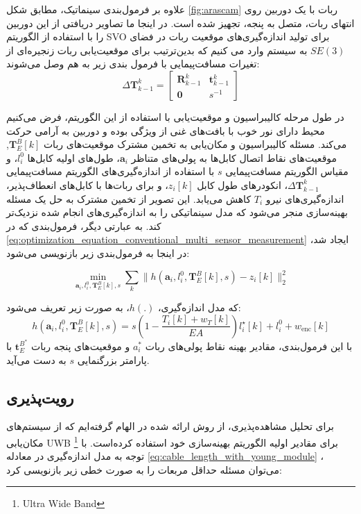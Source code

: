 علاوه بر فرمول‌بندی سینماتیک، مطابق شکل
\ref{fig:arascam}
 ربات با یک دوربین روی انتهای ربات، متصل به پنجه، تجهیز شده است. در اینجا ما تصاویر دریافتی از این دوربین را با استفاده از الگوریتم SVO
\cite{Forster2014ICRA}
  برای تولید اندازه‌گیری‌های موقعیت ربات در فضای
$SE(3)$
به سیستم وارد می کنیم که بدین‌ترتیب برای موقعیت‌یابی ربات زنجیره‌ای از تغیرات مسافت‌پیمایی با فرمول بندی زیر به هم وصل می‌شوند:
\begin{equation}
	\Delta \boldsymbol{T}^k_{k-1} = \begin{bmatrix} \boldsymbol{R}^k_{k-1} & \boldsymbol{t}^k_{k-1} \\ \boldsymbol{0} & s^{-1} \end{bmatrix}
\end{equation}

در طول مرحله کالیبراسیون و موقعیت‌یابی با استفاده از این الگوریتم، فرض می‌کنیم محیط‌ دارای نور خوب با بافت‌های غنی از ویژگی بوده و دوربین به آرامی حرکت می‌کند.  مسئله کالیبراسیون و مکان‌یابی به تخمین مشترک موقعیت‌های ربات
$\boldsymbol{T}^B_E [k]$,
موقعیت‌های نقاط اتصال کابل‌ها به پولی‌های متناظر
$\boldsymbol{a}_i$،
 طول‌های اولیه کابل‌ها
$l_{i}^0$،
و مقیاس الگوریتم مسافت‌پیمایی
$s$
با استفاده از اندازه‌گیری‌های الگوریتم مسافت‌پیمایی
 \( \Delta \boldsymbol{T}^k_{k-1} \)،
انکودرهای طول کابل
$z_i [k]$،
و برای ربات‌ها با کابل‌های انعطاف‌پذیر، اندازه‌گیری‌های نیرو 
$T_i$ 
کاهش می‌یابد. این تصویر از تخمین مشترک به حل یک مسئله بهینه‌سازی منجر می‌شود که مدل سینماتیکی را به اندازه‌گیری‌های انجام شده نزدیک‌تر کند. به عبارتی دیگر، فرمول‌بندی که در
 \ref{eq:optimization_equation_conventional_multi_sensor_measurement} 
 ایجاد شد، در اینجا به فرمول‌بندی زیر بازنویسی می‌شود:

\begin{equation}
	\min_{\boldsymbol{a}_i, l_{i}^0, \boldsymbol{T}^B_E [k], s} \sum_k \| h(\boldsymbol{a}_i, l_{i}^0, \boldsymbol{T}^B_E [k], s) - z_i [k] \|^2_2
\end{equation}

که مدل اندازه‌گیری، \( h(.) \)، به صورت زیر تعریف می‌شود:
\begin{equation}
	h(\boldsymbol{a}_i, l_{i}^0, \boldsymbol{T}^B_E [k], s) = s \left( 1 - \frac{T_i [k] + w_T [k]}{EA} \right) l^\star_i [k] + l_{i}^0 + w_{\text{enc}} [k] 
\end{equation}
با این فرمول‌بندی، مقادیر بهینه نقاط پولی‌های ربات
$a_i^*$
و موقعیت‌های پنجه ربات
$\boldsymbol{t}^{B^{*}}_{E}$
با پارامتر بزرگنمایی
$s$
به دست می‌آید.


\subsection{رویت‌پذیری}
برای تحلیل مشاهده‌پذیری، از روش ارائه شده در
\cite{blueml2021bias}
الهام گرفته‌ایم که از سیستم‌های مکان‌یابی  UWB 
\footnote{Ultra Wide Band}
برای مقادیر اولیه الگوریتم بهینه‌سازی خود استفاده کرده‌است. با توجه به مدل اندازه‌گیری در معادله
\ref{eq:cable_length_with_young_module}
، می‌توان مسئله حداقل مربعات را به صورت خطی زیر بازنویسی کرد:

